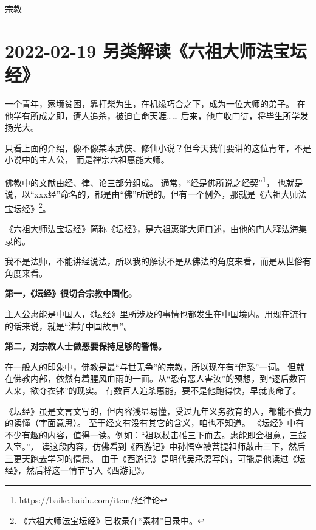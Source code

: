 \begin{taged}{宗教}
\section{2022-02-19 另类解读《六祖大师法宝坛经》}
\end{taged}

一个青年，家境贫困，靠打柴为生，在机缘巧合之下，成为一位大师的弟子。
在他学有所成之即，遭人追杀，被迫亡命天涯…… 后来，他广收门徒，将毕生所学发扬光大。

只看上面的介绍，像不像某本武侠、修仙小说？但今天我们要讲的这位青年，不是小说中的主人公，
而是禅宗六祖惠能大师。

佛教中的文献由经、律、论三部分组成。
通常，“经是佛所说之经契”\footnote{https://baike.baidu.com/item/经律论}，
也就是说，以“xxx经”命名的，都是由“佛”所说的。但有一个例外，那就是《六祖大师法宝坛经》\footnote{《六祖大师法宝坛经》已收录在“素材”目录中。}。

《六祖大师法宝坛经》简称《坛经》，是六祖惠能大师口述，由他的门人释法海集录的。

我不是法师，不能讲经说法，所以我的解读不是从佛法的角度来看，而是从世俗有角度来看。

\textbf{第一，《坛经》很切合宗教中国化。}

主人公惠能是中国人，《坛经》里所涉及的事情也都发生在中国境内。用现在流行的话来说，就是“讲好中国故事”。

\textbf{第二，对宗教人士做恶要保持足够的警惕。}

在一般人的印象中，佛教是最“与世无争”的宗教，所以现在有“佛系”一词。
但就在佛教内部，依然有着腥风血雨的一面。从“恐有恶人害汝”的预想，到“逐后数百人来，欲夺衣钵”的现实。
有数百人追杀惠能，要不是他跑得快，早就丧命了。

《坛经》虽是文言文写的，但内容浅显易懂，受过九年义务教育的人，都能不费力的读懂（字面意思）。
至于经文有没有其它的含义，咱也不知道。
《坛经》中有不少有趣的内容，值得一读。例如：“祖以杖击碓三下而去。惠能即会祖意，三鼓入室。”，
读这段内容，仿佛看到《西游记》中孙悟空被菩提祖师敲击三下，然后三更天跑去学习的情景。
由于《西游记》是明代吴承恩写的，可能是他读过《坛经》，然后将这一情节写入《西游记》。

